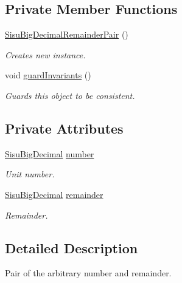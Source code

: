 \subsection*{Private Member Functions}
\begin{DoxyCompactItemize}
\item 
\hyperlink{classcom_1_1aarrelaakso_1_1drawl_1_1_sisu_big_decimal_remainder_pair_a139cc916cab6cd674513508b8f70a11b}{Sisu\+Big\+Decimal\+Remainder\+Pair} ()
\begin{DoxyCompactList}\small\item\em Creates new instance. \end{DoxyCompactList}\item 
void \hyperlink{classcom_1_1aarrelaakso_1_1drawl_1_1_sisu_big_decimal_remainder_pair_a0319a83bc7d31bf3950f4a99c44ae781}{guard\+Invariants} ()
\begin{DoxyCompactList}\small\item\em Guards this object to be consistent. \end{DoxyCompactList}\end{DoxyCompactItemize}
\subsection*{Private Attributes}
\begin{DoxyCompactItemize}
\item 
\hyperlink{classcom_1_1aarrelaakso_1_1drawl_1_1_sisu_big_decimal}{Sisu\+Big\+Decimal} \hyperlink{classcom_1_1aarrelaakso_1_1drawl_1_1_sisu_big_decimal_remainder_pair_aa9a5427a9e385635c8926422a430dcdd}{number}
\begin{DoxyCompactList}\small\item\em Unit number. \end{DoxyCompactList}\item 
\hyperlink{classcom_1_1aarrelaakso_1_1drawl_1_1_sisu_big_decimal}{Sisu\+Big\+Decimal} \hyperlink{classcom_1_1aarrelaakso_1_1drawl_1_1_sisu_big_decimal_remainder_pair_aa67b06e15115b1930dae9de0aa8e039f}{remainder}
\begin{DoxyCompactList}\small\item\em Remainder. \end{DoxyCompactList}\end{DoxyCompactItemize}


\subsection{Detailed Description}
Pair of the arbitrary number and remainder. 

